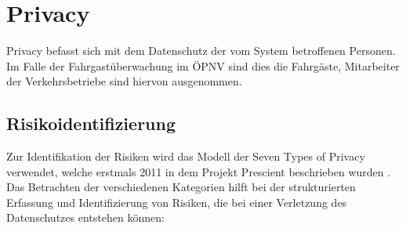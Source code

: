 \section{Privacy}
Privacy befasst sich mit dem Datenschutz der vom System betroffenen Personen. Im Falle der Fahrgastüberwachung im ÖPNV sind dies die Fahrgäste, Mitarbeiter der Verkehrsbetriebe sind hiervon ausgenommen.
\subsection{Risikoidentifizierung}
\label{abschnitt:7types}
Zur Identifikation der Risiken wird das Modell der \glqq{}Seven Types of Privacy\grqq{} verwendet, welche erstmals 2011 in dem Projekt \glqq{}Prescient\grqq{} beschrieben wurden \cite{Gutwirth.23.03.2011}.
Das Betrachten der verschiedenen Kategorien hilft bei der strukturierten Erfassung und Identifizierung von Risiken, die bei einer Verletzung des Datenschutzes entstehen können:
